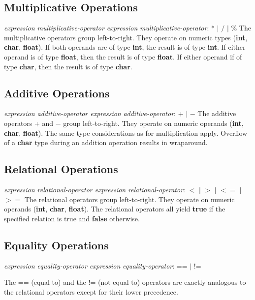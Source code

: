 \begin{homeworkProblem}
	\subsection{Multiplicative Operations}
	\textit{expression multiplicative-operator expression}
	\newline
	\textit{multiplicative-operator}: * $|$ $/$ $|$ \%
	\newline
	The multiplicative operators group left-to-right. They operate on numeric types (\textbf{int}, \textbf{char}, \textbf{float}). If both operands are of type \textbf{int}, the result is of type \textbf{int}. If either operand is of type \textbf{float}, then the result is of type \textbf{float}. If either operand if of type \textbf{char}, then the result is of type \textbf{char}.
	
	\subsection{Additive Operations}
	\textit{expression additive-operator expression}
	\newline
	\textit{additive-operator}: + $|$ $-$
	\newline
	The additive operators + and − group left-to-right. They operate on numeric operands (\textbf{int}, \textbf{char}, \textbf{float}). The same type considerations as for multiplication apply. Overflow of a \textbf{char} type during an addition operation results in wraparound.
	
	\subsection{Relational Operations}
	\textit{expression relational-operator expression}
	\newline
	\textit{relational-operator}: $<$ $|$ $>$ $|$ $<=$ $|$ $>=$
	\newline
	The relational operators group left-to-right. They operate on numeric operands (\textbf{int}, \textbf{char}, \textbf{float}). The relational operators all yield \textbf{true} if the specified relation is true and \textbf{false} otherwise.
	
	\subsection{Equality Operations}
	\textit{expression equality-operator expression}
	\newline
	\textit{equality-operator}: == $|$ != 
	
	The == (equal to) and the != (not equal to) operators are exactly analogous to the relational operators except for their lower precedence.
	

\end{homeworkProblem}
